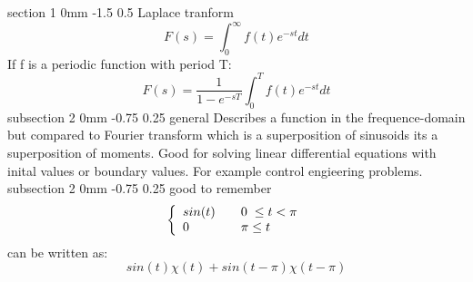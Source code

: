\documentclass[a4paper,11pt]{article}
\makeatletter
\renewcommand{\section}{\@startsection
   {section}%
   {1}%
   {0mm}%
   {-1.5\baselineskip}%
   {0.5\baselineskip}%
   {\sffamily\bfseries\upshape\normalsize}}%
\renewcommand{\subsection}{\@startsection
   {subsection}%
   {2}%
   {0mm}%
   {-0.75\baselineskip}%
   {0.25\baselineskip}%
   {\rmfamily\normalfont\slshape\normalsize}}%
\makeatother
\begin{document}
\section{Laplace tranform}
$$F(s)=\int_{0}^{\infty}f(t)e^{-st}dt$$
If f is a periodic function with period T:
$$F(s)=\dfrac{1}{1-e^{-sT}}\int_{0}^{T}f(t)e^{-st}dt$$
\subsection{general}
Describes a function in the frequence-domain but compared to Fourier transform which is a superposition of sinusoids its a superposition of moments.
Good for solving linear differential equations with inital values or boundary values. For example control engieering problems.
\subsection{good to remember}
\[  \left\{
  \begin{array}{l l}
    sin(t) & \quad 0 \; \leq t<\pi\\
    0 & \quad \pi \leq t 
  \end{array} \right.\]
  can be written as:
  $$sin(t)\chi(t)+sin(t-\pi)\chi(t-\pi)$$
  
\end{document}
